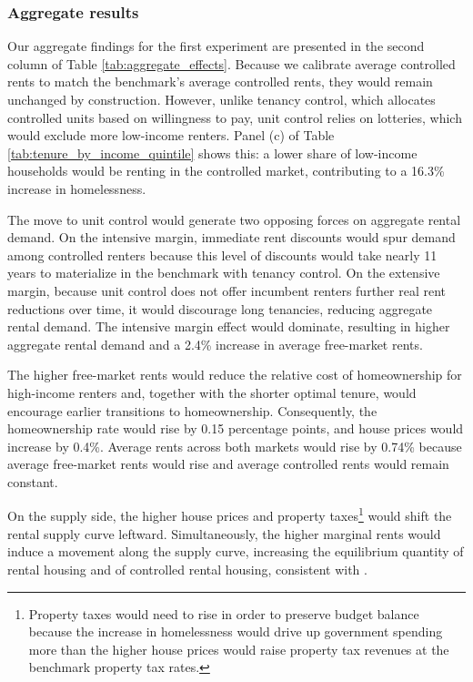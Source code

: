\documentclass[parskip=full]{article}
\begin{document}
\subsubsection{Aggregate results}

Our aggregate findings for the first experiment are presented in the second column of Table \ref{tab:aggregate_effects}. Because we calibrate average controlled rents to match the benchmark's average controlled rents, they would remain unchanged by construction. However, unlike tenancy control, which allocates controlled units based on willingness to pay, unit control relies on lotteries, which would exclude more low-income renters. Panel (c) of Table \ref{tab:tenure_by_income_quintile} shows this: a lower share of low-income households would be renting in the controlled market, contributing to a 16.3\% increase in homelessness.

The move to unit control would generate two opposing forces on aggregate rental demand. On the intensive margin, immediate rent discounts would spur demand among controlled renters because this level of discounts would take nearly 11 years to materialize in the benchmark with tenancy control. On the extensive margin, because unit control does not offer incumbent renters further real rent reductions over time, it would discourage long tenancies, reducing aggregate rental demand. The intensive margin effect would dominate, resulting in higher aggregate rental demand and a 2.4\% increase in average free-market rents. 

The higher free-market rents would reduce the relative cost of homeownership for high-income renters and, together with the shorter optimal tenure, would encourage earlier transitions to homeownership. Consequently, the homeownership rate would rise by 0.15 percentage points, and house prices would increase by 0.4\%. Average rents across both markets would rise by 0.74\% because average free-market rents would rise and average controlled rents would remain constant.

On the supply side, the higher house prices and property taxes\footnote{Property taxes would need to rise in order to preserve budget balance because the increase in homelessness would drive up government spending more than the higher house prices would raise property tax revenues at the benchmark property tax rates.} would shift the rental supply curve leftward. Simultaneously, the higher marginal rents would induce a movement along the supply curve, increasing the equilibrium quantity of rental housing and of controlled rental housing, consistent with \citet{fallis-1985}.
\end{document}
